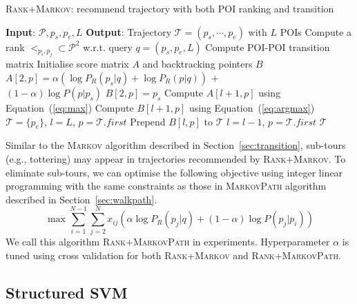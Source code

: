 \begin{algorithm}[t]
\caption{\textsc{Rank+Markov}: recommend trajectory with both POI ranking and transition}
\label{alg:rank+markov}
\begin{algorithmic}[1]
\STATE \textbf{Input}: $\mathcal{P}, p_s, p_e, L$
\STATE \textbf{Output}: Trajectory $\mathcal{T} = (p_s, \cdots, p_e)$ with $L$ POIs
\STATE Compute a rank $<_{p_i, p_j} \subset \mathcal{P}^2$ w.r.t. query $q = (p_s, p_e, L)$
\STATE Compute POI-POI transition matrix
\STATE Initialise score matrix $A$ and backtracking pointers $B$
    \STATE $A[2, p] = \alpha ( \log P_R(p_s|q) + \log P_R(p|q) )$ $+$ \\ \hfill $(1-\alpha) \log P(p|p_s)$
    \STATE $B[2, p] = p_s$
\ENDFOR
{}
        \STATE Compute $A[l+1, p]$ using Equation~(\ref{eq:max})
        \STATE Compute $B[l+1, p]$ using Equation~(\ref{eq:argmax})
    \ENDFOR
\ENDFOR
\STATE $\mathcal{T}= \{p_e\}$, $l = L$, $p = \mathcal{T}.first$
\REPEAT
    \STATE Prepend $B[l, p]$ to $\mathcal{T}$
    \STATE $l = l - 1$, $p = \mathcal{T}.first$
\RETURN $\mathcal{T}$
\end{algorithmic}
\end{algorithm}

Similar to the \textsc{Markov} algorithm described in Section~\ref{sec:transition},
sub-tours (e.g., tottering) may appear in trajectories recommended by \textsc{Rank+Markov}.
To eliminate sub-tours, we can optimise the following objective using integer linear programming
with the same constraints as those in \textsc{MarkovPath} algorithm described in Section~\ref{sec:walkpath}.
\begin{displaymath}
    \max  \sum_{i=1}^{N-1} \sum_{j=2}^N x_{ij} (\alpha \log P_R(p_j | q) + (1-\alpha) \log P(p_j | p_i))
\end{displaymath}
We call this algorithm \textsc{Rank+MarkovPath} in experiments.
Hyperparameter $\alpha$ is tuned using cross validation for both \textsc{Rank+Markov} and \textsc{Rank+MarkovPath}. 

\subsection{Structured SVM}
\label{sec:ssvm}
\secmoveup


